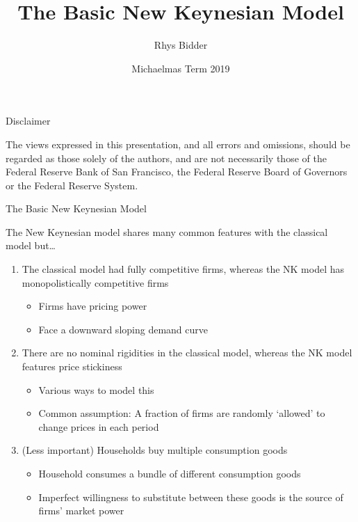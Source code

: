\documentclass{beamer}
\begin{document}
\title[New Keynesian Model]{The Basic New Keynesian Model}
\author[Bidder]{Rhys Bidder}
\date{Michaelmas Term 2019}
\maketitle


\begin{frame}{Disclaimer}

The views expressed in this presentation, and all errors and omissions, should be regarded as those solely of the authors, and are not necessarily those of the Federal Reserve Bank of San Francisco, the Federal Reserve Board of Governors or the Federal Reserve System.

\end{frame}


	
\begin{frame}{The Basic New Keynesian Model}

The New Keynesian model shares many common features with the classical model but\ldots
\begin{enumerate}
\item	The classical model had fully competitive firms, whereas the NK model has monopolistically competitive firms
	\begin{itemize}
	\item	Firms have pricing power
	\item	Face a downward sloping demand curve
	\end{itemize}
\item	There are no nominal rigidities in the classical model, whereas the NK model features price stickiness
	\begin{itemize}
	\item	Various ways to model this
	\item	Common assumption: A fraction of firms are randomly `allowed' to change prices in each period
	\end{itemize}
\item	(Less important) Households buy multiple consumption goods
	\begin{itemize}
	\item	Household consumes a bundle of different consumption goods
	\item	Imperfect willingness to substitute between these goods is the source of firms' market power
	\end{itemize}
\end{enumerate}

\end{frame}
\end{document}
